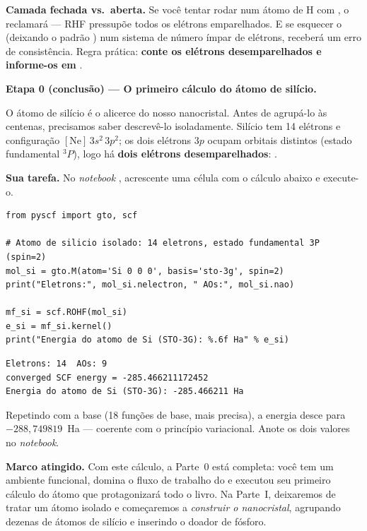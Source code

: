 \begin{caixaatencao}
\textbf{Camada fechada vs.\ aberta.} Se você tentar rodar  num átomo
de H com , o \pyscf{} reclamará --- RHF pressupõe todos os elétrons
emparelhados. E se esquecer o  (deixando o padrão ) num
sistema de número ímpar de elétrons, receberá um erro de consistência. Regra
prática: \textbf{conte os elétrons desemparelhados e informe-os em }.
\end{caixaatencao}

\begin{caixaancora}
\textbf{Etapa 0 (conclusão) --- O primeiro cálculo do átomo de silício.}

O átomo de silício é o alicerce do nosso nanocristal. Antes de agrupá-lo às
centenas, precisamos saber descrevê-lo isoladamente. Silício tem 14 elétrons e
configuração $[\mathrm{Ne}]\,3s^2\,3p^2$; os dois elétrons $3p$ ocupam orbitais
distintos (estado fundamental $^3P$), logo há \textbf{dois elétrons
desemparelhados}: .

\vspace{0.3cm}
\textbf{Sua tarefa.} No \emph{notebook} ,
acrescente uma célula com o cálculo abaixo e execute-o.

\begin{lstlisting}[style=python]
from pyscf import gto, scf

# Atomo de silicio isolado: 14 eletrons, estado fundamental 3P (spin=2)
mol_si = gto.M(atom='Si 0 0 0', basis='sto-3g', spin=2)
print("Eletrons:", mol_si.nelectron, " AOs:", mol_si.nao)

mf_si = scf.ROHF(mol_si)
e_si = mf_si.kernel()
print("Energia do atomo de Si (STO-3G): %.6f Ha" % e_si)
\end{lstlisting}

\begin{lstlisting}[style=console]
Eletrons: 14  AOs: 9
converged SCF energy = -285.466211172452
Energia do atomo de Si (STO-3G): -285.466211 Ha
\end{lstlisting}

Repetindo com a base  (18 funções de base, mais precisa), a energia
desce para $-288{,}749819$~Ha --- coerente com o princípio variacional. Anote os
dois valores no \emph{notebook}.

\vspace{0.3cm}
\textbf{Marco atingido.} Com este cálculo, a Parte~0 está completa: você tem um
ambiente funcional, domina o fluxo de trabalho do \pyscf{} e executou seu primeiro
cálculo do átomo que protagonizará todo o livro. Na Parte~I, deixaremos de tratar
um átomo isolado e começaremos a \emph{construir o nanocristal}, agrupando dezenas
de átomos de silício e inserindo o doador de fósforo.
\end{caixaancora}

